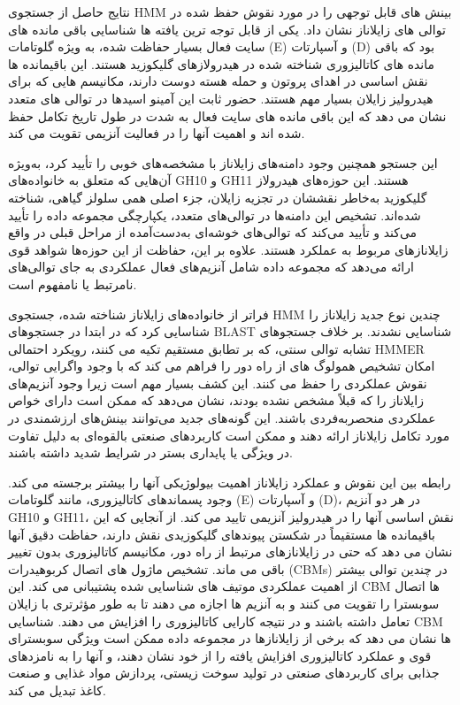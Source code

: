                 نتایج حاصل از جستجوی HMM بینش های قابل توجهی را در مورد نقوش حفظ شده در توالی های زایلاناز نشان داد. یکی از قابل توجه ترین یافته ها شناسایی باقی مانده های سایت فعال بسیار حفاظت شده، به ویژه گلوتامات (E) و آسپارتات (D) بود که باقی مانده های کاتالیزوری شناخته شده در هیدرولازهای گلیکوزید هستند. این باقیمانده ها نقش اساسی در اهدای پروتون و حمله هسته دوست دارند، مکانیسم هایی که برای هیدرولیز زایلان بسیار مهم هستند. حضور ثابت این آمینو اسیدها در توالی های متعدد نشان می دهد که این باقی مانده های سایت فعال به شدت در طول تاریخ تکامل حفظ شده اند و اهمیت آنها را در فعالیت آنزیمی تقویت می کند.

                این جستجو همچنین وجود دامنه‌های زایلاناز با مشخصه‌های خوبی را تأیید کرد، به‌ویژه آن‌هایی که متعلق به خانواده‌های GH10 و GH11 هستند. این حوزه‌های هیدرولاز گلیکوزید به‌خاطر نقششان در تجزیه زایلان، جزء اصلی همی سلولز گیاهی، شناخته شده‌اند. تشخیص این دامنه‌ها در توالی‌های متعدد، یکپارچگی مجموعه داده را تأیید می‌کند و تأیید می‌کند که توالی‌های خوشه‌ای به‌دست‌آمده از مراحل قبلی در واقع زایلانازهای مربوط به عملکرد هستند. علاوه بر این، حفاظت از این حوزه‌ها شواهد قوی ارائه می‌دهد که مجموعه داده شامل آنزیم‌های فعال عملکردی به جای توالی‌های نامرتبط یا نامفهوم است.

                فراتر از خانواده‌های زایلاناز شناخته شده، جستجوی HMM چندین نوع جدید زایلاناز را شناسایی کرد که در ابتدا در جستجوهای BLAST شناسایی نشدند. بر خلاف جستجوهای تشابه توالی سنتی، که بر تطابق مستقیم تکیه می کنند، رویکرد احتمالی HMMER امکان تشخیص همولوگ های از راه دور را فراهم می کند که با وجود واگرایی توالی، نقوش عملکردی را حفظ می کنند. این کشف بسیار مهم است زیرا وجود آنزیم‌های زایلاناز را که قبلاً مشخص نشده بودند، نشان می‌دهد که ممکن است دارای خواص عملکردی منحصربه‌فردی باشند. این گونه‌های جدید می‌توانند بینش‌های ارزشمندی در مورد تکامل زایلاناز ارائه دهند و ممکن است کاربردهای صنعتی بالقوه‌ای به دلیل تفاوت در ویژگی یا پایداری بستر در شرایط شدید داشته باشند.

                رابطه بین این نقوش و عملکرد زایلاناز اهمیت بیولوژیکی آنها را بیشتر برجسته می کند. وجود پسماندهای کاتالیزوری، مانند گلوتامات (E) و آسپارتات (D)، در هر دو آنزیم GH10 و GH11، نقش اساسی آنها را در هیدرولیز آنزیمی تایید می کند. از آنجایی که این باقیمانده ها مستقیماً در شکستن پیوندهای گلیکوزیدی نقش دارند، حفاظت دقیق آنها نشان می دهد که حتی در زایلانازهای مرتبط از راه دور، مکانیسم کاتالیزوری بدون تغییر باقی می ماند. تشخیص ماژول های اتصال کربوهیدرات (CBMs) در چندین توالی بیشتر از اهمیت عملکردی موتیف های شناسایی شده پشتیبانی می کند. این CBM ها اتصال سوبسترا را تقویت می کنند و به آنزیم ها اجازه می دهند تا به طور مؤثرتری با زایلان تعامل داشته باشند و در نتیجه کارایی کاتالیزوری را افزایش می دهند. شناسایی CBM ها نشان می دهد که برخی از زایلانازها در مجموعه داده ممکن است ویژگی سوبسترای قوی و عملکرد کاتالیزوری افزایش یافته را از خود نشان دهند، و آنها را به نامزدهای جذابی برای کاربردهای صنعتی در تولید سوخت زیستی، پردازش مواد غذایی و صنعت کاغذ تبدیل می کند.

